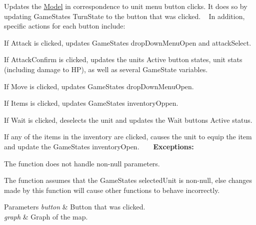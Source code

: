 Updates the \hyperlink{namespace_model}{Model} in correspondence to unit menu button clicks. It does so by updating Game\+State\textquotesingle{}s Turn\+State to the button that was clicked. ~\newline
 In addition, specific actions for each button include\+:
\begin{DoxyItemize}
\item If Attack is clicked, updates Game\+State\textquotesingle{}s drop\+Down\+Menu\+Open and attack\+Select.
\item If Attack\+Confirm is clicked, updates the unit\textquotesingle{}s Active button states, unit stats (including damage to HP), as well as several Game\+State variables.
\item If Move is clicked, updates Game\+State\textquotesingle{}s drop\+Down\+Menu\+Open.
\item If Items is clicked, updates Game\+State\textquotesingle{}s inventory\+Oppen.
\item If Wait is clicked, deselects the unit and updates the Wait button\textquotesingle{}s Active status.
\item If any of the items in the inventory are clicked, causes the unit to equip the item and update the Game\+State\textquotesingle{}s inventory\+Open. ~\newline
~\newline
 {\bfseries Exceptions\+:} ~\newline

\item The function does not handle non-\/null parameters.
\item The function assumes that the Game\+State\textquotesingle{}s selected\+Unit is non-\/null, else changes made by this function will cause other functions to behave incorrectly. 
\begin{DoxyParams}{Parameters}
{\em button} & Button that was clicked. \\
\hline
{\em graph} & Graph of the map. \\
\hline
\end{DoxyParams}

\end{DoxyItemize}\hypertarget{class_controller_1_1_game_function_afc2f3baed432319b1e7bfc5dae69b634}{}\label{class_controller_1_1_game_function_afc2f3baed432319b1e7bfc5dae69b634} 
